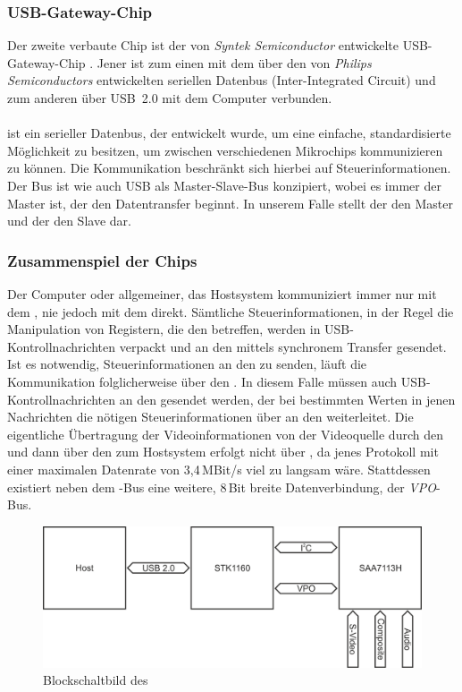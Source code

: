 \subsubsection{USB-Gateway-Chip \stk}
Der zweite verbaute Chip ist der von \emph{Syntek Semiconductor} entwickelte USB-Gateway-Chip \stk.
Jener ist zum einen mit dem \saa{} über den von \emph{Philips Semiconductors} entwickelten seriellen Datenbus \iic{} (Inter-Integrated Circuit) und zum anderen über USB~2.0 mit dem Computer verbunden.

\paragraph{\iic}
\iic{} ist ein serieller Datenbus, der entwickelt wurde, um eine einfache, standardisierte Möglichkeit zu besitzen, um zwischen verschiedenen Mikrochips kommunizieren zu können.
Die Kommunikation beschränkt sich hierbei auf Steuerinformationen.
Der Bus ist wie auch USB als Master-Slave-Bus konzipiert, wobei es immer der Master ist, der den Datentransfer beginnt.
In unserem Falle stellt der \stk{} den Master und der \saa{} den Slave dar.

\subsubsection{Zusammenspiel der Chips}
\label{section:zusammenspiel}
Der Computer oder allgemeiner, das Hostsystem kommuniziert immer nur mit dem \stk, nie jedoch mit dem \saa{} direkt.
Sämtliche Steuerinformationen, in der Regel die Manipulation von Registern, die den \stk{} betreffen, werden in USB-Kontrollnachrichten verpackt und an den \stk{} mittels synchronem Transfer gesendet.
Ist es notwendig, Steuerinformationen an den \saa{} zu senden, läuft die Kommunikation folglicherweise über den \stk.
In diesem Falle müssen auch USB-Kontrollnachrichten an den \stk{} gesendet werden, der bei bestimmten Werten in jenen Nachrichten die nötigen Steuerinformationen über \iic{} an den \saa{} weiterleitet.
Die eigentliche Übertragung der Videoinformationen von der Videoquelle durch den \saa{} und dann über den \stk{} zum Hostsystem erfolgt nicht über \iic, da jenes Protokoll mit einer maximalen Datenrate von 3,4\,MBit/s viel zu langsam wäre.
Stattdessen existiert neben dem \iic-Bus eine weitere, 8\,Bit breite Datenverbindung, der \emph{VPO}-Bus.
\begin{figure}[h]
 \centering
 \includegraphics[width=\textwidth]{blockschaltbild}
 \caption{Blockschaltbild des \easycap{}}
\end{figure}

